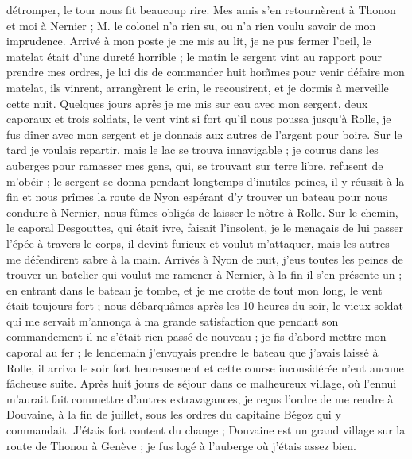 \documentclass[12pt]{article}
\begin{document}
 détromper, le tour nous fit beaucoup rire. Mes amis s’en
retournèrent à Thonon et moi à Nernier ; M. le colonel n’a rien su, ou n’a rien voulu savoir de mon
imprudence. Arrivé à mon poste je me mis au lit, je ne pus fermer l’oeil, le matelat était d’une
dureté horrible ; le matin le sergent vint au rapport pour prendre mes ordres, je lui dis de
commander huit hom̃mes pour venir défaire mon matelat, ils vinrent, arrangèrent le crin, le
recousirent, et je dormis à merveille cette nuit. Quelques jours aprè́s je me mis sur eau avec mon
sergent, deux caporaux et trois soldats, le vent vint si fort qu’il nous poussa jusqu’à Rolle, je
fus dîner avec mon sergent et je donnais aux autres de l’argent pour boire. Sur le tard je voulais
repartir, mais le lac se trouva innavigable ; je courus dans les auberges pour ramasser mes gens,
qui, se trouvant sur terre libre, refusent de m’obéir ; le sergent se donna pendant longtemps
d’inutiles peines, il y réussit à la fin et nous prîmes la route de Nyon espérant d’y trouver un
bateau pour nous conduire à Nernier, nous fûmes obligés de laisser le nôtre à Rolle. Sur le chemin,
le caporal Desgouttes, qui était ivre, faisait l’insolent, je le menaçais de lui passer l’épée à
travers le corps, il devint furieux et voulut m’attaquer, mais les autres me défendirent sabre à la
main. Arrivés à Nyon de nuit, j’eus toutes les peines de trouver un batelier qui voulut me ramener à
Nernier, à la fin il s’en présente un ; en entrant dans le bateau je tombe, et je me crotte de tout
mon long, le vent était toujours fort ; nous débarquâmes après les 10 heures du soir, le vieux
soldat qui me servait m’annonça à ma grande satisfaction que pendant son commandement il ne s’était
rien passé de nouveau ; je fis d’abord mettre mon caporal au fer ; le lendemain j’envoyais prendre
le bateau que j’avais laissé à Rolle, il arriva le soir fort heureusement et cette course
inconsidérée n’eut aucune fâcheuse suite. Après huit jours de séjour dans ce malheureux village, où
l’ennui m’aurait fait commettre d’autres extravagances, je reçus l’ordre de me rendre à Douvaine, à
la fin de juillet, sous les ordres du capitaine Bégoz qui y commandait. J’étais fort content du
change ; Douvaine est un grand village sur la route de Thonon à Genève ; je fus logé à l’auberge où
j’étais assez bien.
\end{document}

